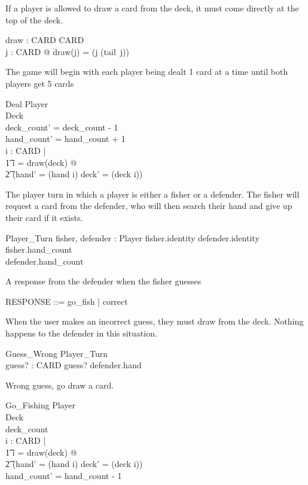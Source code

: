 \documentclass{article}
\begin{document}
If a player is allowed to draw a card from the deck, it must come
directly at the top of the deck.
\begin{axdef}
    draw : \power CARD \fun \power CARD\\
    \where
    \forall j : \power CARD @ draw(j) = (j \setminus (tail~j))
\end{axdef}

The game will begin with each player being dealt 1 card at a time
until both players get 5 cards
\begin{schema}{Deal}
    \Delta Player \\
    \Delta Deck \\
    \where
    deck\_count' = deck\_count - 1\\  
    hand\_count' = hand\_count + 1\\
    \forall i : \power CARD | \\
    \t1 i = draw(deck) @ \\
    \t2 (hand' = (hand \cup i) \land deck' = (deck \setminus i))
\end{schema}

The player turn in which a player is either a fisher
or a defender. The fisher will request a card from the defender,
who will then search their hand and give up their card if it exists.
\begin{schema}{Player\_Turn}
    fisher, defender : Player
    \where
    fisher.identity \neq defender.identity\\
    fisher.hand\_count \\
    defender.hand\_count 
\end{schema}

A response from the defender when the fisher guesses
\begin{zed}
RESPONSE ::= go\_fish | correct
\end{zed}

When the user makes an incorrect guess, they must draw from
the deck. Nothing happens to the defender in this situation.
\begin{schema}{Guess\_Wrong}
    \Xi Player\_Turn \\
    guess? : CARD 
    \where
    guess? \notin defender.hand \\
\end{schema}

Wrong guess, go draw a card.
\begin{schema}{Go\_Fishing}
    \Delta Player\\
    \Delta Deck \\
    \where
    deck\_count  \\
    \forall i : \power CARD | \\
    \t1 i = draw(deck) @ \\
    \t2 (hand' = (hand \cup i) \land deck' = (deck \setminus i)) \\
    hand\_count' = hand\_count - 1 \\
\end{schema}
 
\end{document}
